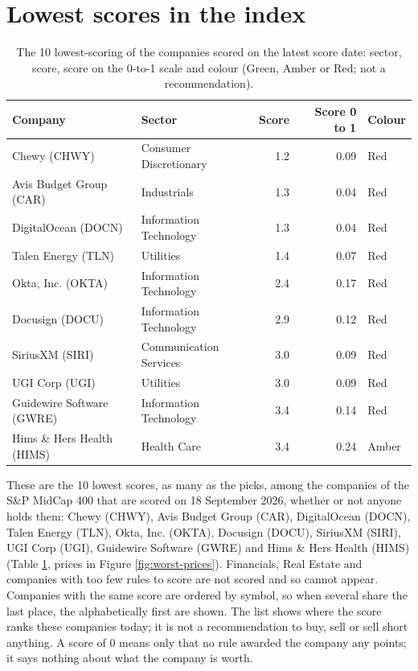 \documentclass[11pt,a4paper]{article}
\begin{document}
\section{Lowest scores in the index}
\label{sec:worst}
\begin{table}[H]
\centering
\small
\caption{The 10 lowest-scoring of the companies scored on the latest score date: sector, score, score on the 0-to-1 scale and colour (Green, Amber or Red; not a recommendation).}\label{tab:worst}
\begin{tabular}{p{4.4cm} p{3cm} r r p{3cm}}
\hline
Company & Sector & Score & Score 0 to 1 & Colour \\
\hline
Chewy (CHWY) & Consumer Discretionary & 1.2 & 0.09 & \cellcolor[HTML]{F4B6B6}Red \\
Avis Budget Group (CAR) & Industrials & 1.3 & 0.04 & \cellcolor[HTML]{F4B6B6}Red \\
DigitalOcean (DOCN) & Information Technology & 1.3 & 0.04 & \cellcolor[HTML]{F4B6B6}Red \\
Talen Energy (TLN) & Utilities & 1.4 & 0.07 & \cellcolor[HTML]{F4B6B6}Red \\
Okta, Inc. (OKTA) & Information Technology & 2.4 & 0.17 & \cellcolor[HTML]{F4B6B6}Red \\
Docusign (DOCU) & Information Technology & 2.9 & 0.12 & \cellcolor[HTML]{F4B6B6}Red \\
SiriusXM (SIRI) & Communication Services & 3.0 & 0.09 & \cellcolor[HTML]{F4B6B6}Red \\
UGI Corp (UGI) & Utilities & 3.0 & 0.09 & \cellcolor[HTML]{F4B6B6}Red \\
Guidewire Software (GWRE) & Information Technology & 3.4 & 0.14 & \cellcolor[HTML]{F4B6B6}Red \\
Hims \& Hers Health (HIMS) & Health Care & 3.4 & 0.24 & \cellcolor[HTML]{FFEB9C}Amber \\
\hline
\end{tabular}
\end{table}
These are the 10 lowest scores, as many as the picks, among the companies of the S\&P MidCap 400 that are scored on 18 September 2026, whether or not anyone holds them: Chewy (CHWY), Avis Budget Group (CAR), DigitalOcean (DOCN), Talen Energy (TLN), Okta, Inc. (OKTA), Docusign (DOCU), SiriusXM (SIRI), UGI Corp (UGI), Guidewire Software (GWRE) and Hims \& Hers Health (HIMS) (Table \ref{tab:worst}, prices in Figure \ref{fig:worst-prices}). Financials, Real Estate and companies with too few rules to score are not scored and so cannot appear. Companies with the same score are ordered by symbol, so when several share the last place, the alphabetically first are shown. The list shows where the score ranks these companies today; it is not a recommendation to buy, sell or sell short anything. A score of 0 means only that no rule awarded the company any points; it says nothing about what the company is worth.
\end{document}
